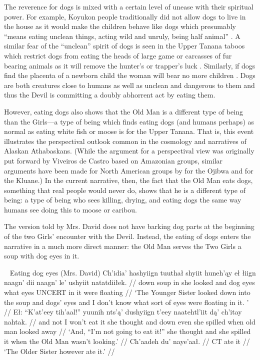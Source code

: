The reverence for dogs is mixed with a certain level of unease with their spiritual power. For example, Koyukon people traditionally did not allow dogs to live in the house as it would make the children behave like dogs which presumably ``means eating unclean things, acting wild and unruly, being half animal'' \citep[191]{NelsonR1983}. A similar fear of the ``unclean'' spirit of dogs is seen in the Upper Tanana taboos which restrict dogs from eating the heads of large game or carcasses of fur bearing animals as it will remove the hunter's or trapper's luck \citep[168]{McKennanR1959}. Similarly, if dogs find the placenta of a newborn child the woman will bear no more children \citep[167]{McKennanR1959}. Dogs are both creatures close to humans as well as unclean and dangerous to them and thus the Devil is committing a doubly abhorrent act by eating them.

However, eating dogs also shows that the Old Man is a different type of being than the Girls—a type of being which finds eating dogs (and humans perhaps) as normal as eating white fish or moose is for the Upper Tanana. That is, this event illustrates the perspectival \citep{ViveirosDeCastroE1998} outlook common in the cosmology and narratives of Alaskan Athabaskans. (While the argument for a perspectival view was originally put forward by Viveiros de Castro based on Amazonian groups, similar arguments have been made for North American groups by \citet{IngoldT2000} for the Ojibwa and \citet{NadasdyP2003} for the Kluane.) In the current narrative, then, the fact that the Old Man eats dogs, something that real people would never do, shows that he is a different type of being: a type of being who sees killing, drying, and eating dogs the same way humans see doing this to moose or caribou.

The version told by Mrs. David does not have barking dog parts at the beginning of the two Girls' encounter with the Devil. Instead, the eating of dogs enters the narrative in a much more direct manner: the Old Man serves the Two Girls a soup with dog eyes in it.

\pex~ Eating dog eyes (Mrs. David) 
\a
\begingl
\gla Ch'idia' hashyiign tuuthał shyiit huneh'ąy eł łiign naagn' dii naagn' le' ushyiit natatdiiłek.   //
 down soup in {she looked} and dog eyes what eyes UNCERT {in it} {were floating} //
\glft `The Younger Sister looked down into the soup and dogs' eyes and I don't know what sort of eyes were floating in it. ' //
\endgl
\a
\begingl
\gla Eł: ``K'at'eey tih'aal!'' yuunih nts'ą' dushyiign t'eey naatehtl'iit dą' ch'itay nahtak.  //
\glb and not {I won't eat it} {she thought} and down even {she spilled} when {old man} {looked away}  //
\glft `And, ``I'm not going to eat it!'' she thought and she spilled it when the Old Man wasn't looking.' //
\endgl
\a
\begingl
\gla  Ch'aadeh du' naye'aał.  //
 CT {ate it} //
\glft `The Older Sister however ate it.' //
\endgl
\xe


